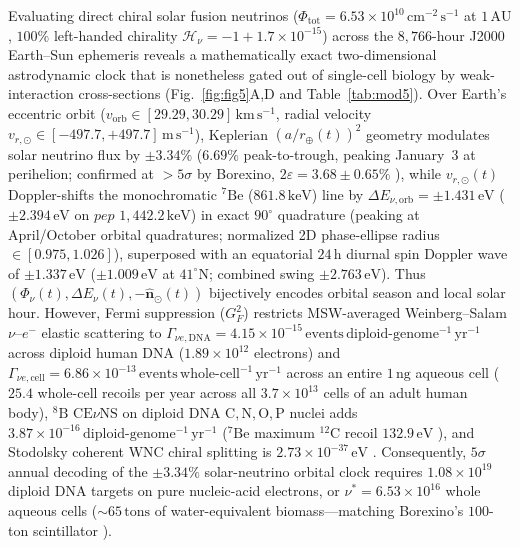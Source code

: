 \documentclass[10pt,letterpaper]{article}
\theoremstyle{plain}
\theoremstyle{definition}
\begin{document}
Evaluating direct chiral solar fusion neutrinos ($\Phi_{\mathrm{tot}} = 6.53 \times 10^{10}\,\mathrm{cm^{-2}\,s^{-1}}$ at $1\,\mathrm{AU}$, $100\%$ left-handed chirality $\mathcal{H}_\nu = -1 + 1.7 \times 10^{-15}$) across the $8{,}766$-hour J2000 Earth--Sun ephemeris reveals a mathematically exact two-dimensional astrodynamic clock that is nonetheless gated out of single-cell biology by weak-interaction cross-sections (Fig.~\ref{fig:fig5}A,D and Table~\ref{tab:mod5}). Over Earth's eccentric orbit ($v_{\mathrm{orb}} \in [29.29, 30.29]\,\mathrm{km\,s^{-1}}$, radial velocity $v_{r,\odot} \in [-497.7, +497.7]\,\mathrm{m\,s^{-1}}$), Keplerian $(a/r_\oplus(t))^2$ geometry modulates solar neutrino flux by $\pm 3.34\%$ ($6.69\%$ peak-to-trough, peaking January~3 at perihelion; confirmed at $>5\sigma$ by Borexino, $2\varepsilon = 3.68 \pm 0.65\%$ \cite{appel2022borexino}), while $v_{r,\odot}(t)$ Doppler-shifts the monochromatic $^7\mathrm{Be}$ ($861.8\,\mathrm{keV}$) line by $\Delta E_{\nu,\mathrm{orb}} = \pm 1.431\,\mathrm{eV}$ ($\pm 2.394\,\mathrm{eV}$ on $pep$ $1{,}442.2\,\mathrm{keV}$) in exact $90^\circ$ quadrature (peaking at April/October orbital quadratures; normalized 2D phase-ellipse radius $\in [0.975, 1.026]$), superposed with an equatorial $24\,\mathrm{h}$ diurnal spin Doppler wave of $\pm 1.337\,\mathrm{eV}$ ($\pm 1.009\,\mathrm{eV}$ at $41^\circ\mathrm{N}$; combined swing $\pm 2.763\,\mathrm{eV}$). Thus $(\Phi_\nu(t), \Delta E_\nu(t), -\hat{\mathbf{n}}_\odot(t))$ bijectively encodes orbital season and local solar hour. However, Fermi suppression ($G_F^2$) restricts MSW-averaged Weinberg--Salam $\nu\text{--}e^-$ elastic scattering to $\Gamma_{\nu e,\mathrm{DNA}} = 4.15 \times 10^{-15}\,\mathrm{events\,diploid\text{-}genome^{-1}\,yr^{-1}}$ across diploid human DNA ($1.89 \times 10^{12}$ electrons) and $\Gamma_{\nu e,\mathrm{cell}} = 6.86 \times 10^{-13}\,\mathrm{events\,whole\text{-}cell^{-1}\,yr^{-1}}$ across an entire $1\,\mathrm{ng}$ aqueous cell ($25.4$ whole-cell recoils per year across all $3.7 \times 10^{13}$ cells of an adult human body), $^8\mathrm{B}$ $\mathrm{CE}\nu\mathrm{NS}$ on diploid DNA $\mathrm{C,N,O,P}$ nuclei adds $3.87 \times 10^{-16}\,\mathrm{diploid\text{-}genome^{-1}\,yr^{-1}}$ ($^7\mathrm{Be}$ maximum $^{12}\mathrm{C}$ recoil $132.9\,\mathrm{eV}$ \cite{barbeau2014prl}), and Stodolsky coherent WNC chiral splitting is $2.73 \times 10^{-37}\,\mathrm{eV}$ \cite{jannat2026neutrinos}. Consequently, $5\sigma$ annual decoding of the $\pm 3.34\%$ solar-neutrino orbital clock requires $1.08 \times 10^{19}$ diploid DNA targets on pure nucleic-acid electrons, or $\nu^* = 6.53 \times 10^{16}$ whole aqueous cells ($\sim 65\,\mathrm{tons}$ of water-equivalent biomass---matching Borexino's $100$-ton scintillator \cite{appel2022borexino}).
\end{document}
